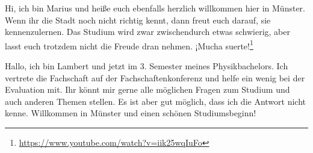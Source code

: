 \begin{multicols}{2}
\vspace{-0.8cm}

{
Hi, ich bin Marius und heiße euch ebenfalls herzlich willkommen hier in Münster. Wenn ihr die Stadt noch nicht richtig kennt, dann freut euch darauf, sie kennenzulernen. 
Das Studium wird zwar zwischendurch etwas schwierig, aber lasst euch trotzdem nicht die Freude dran nehmen. ¡Mucha suerte!\footnote{\url{https://www.youtube.com/watch?v=iik25wqIuFo}}
}

{
Hallo, ich bin Lambert und jetzt im 3. Semester meines Physikbachelors. Ich vertrete die Fachschaft auf der Fachschaftenkonferenz und helfe ein wenig bei der Evaluation mit. 
Ihr könnt mir gerne alle möglichen Fragen zum Studium und auch anderen Themen stellen. Es ist aber gut möglich, dass ich die Antwort nicht kenne. 
Willkommen in Münster und einen schönen Studiumsbeginn!
}


\end{multicols}
